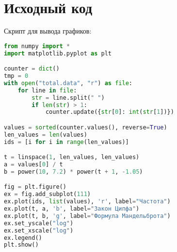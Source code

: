 \lstset{extendedchars=\true}
\section{Исходный код}

Скрипт для вывода графиков:
\begin{lstlisting}[language=Python]
from numpy import *
import matplotlib.pyplot as plt

counter = dict()
tmp = 0
with open("total.data", "r") as file:
    for line in file:
        str = line.split(" ")
        if len(str) > 1:
            counter.update({str[0]: int(str[1])})

values = sorted(counter.values(), reverse=True)
len_values = len(values)
ids = [i for i in range(len_values)]

t = linspace(1, len_values, len_values)
a = values[0] / t
b = power(10, 7.2) * power(t + 1, -1.05)

fig = plt.figure()
ex = fig.add_subplot(111)
ex.plot(ids, list(values), 'r', label="Частота")
ex.plot(t, a, 'b', label="Закон Ципфа")
ex.plot(t, b, 'g', label="Формула Мандельброта")
ex.set_yscale("log")
ex.set_xscale("log")
ex.legend()
plt.show()
\end{lstlisting}